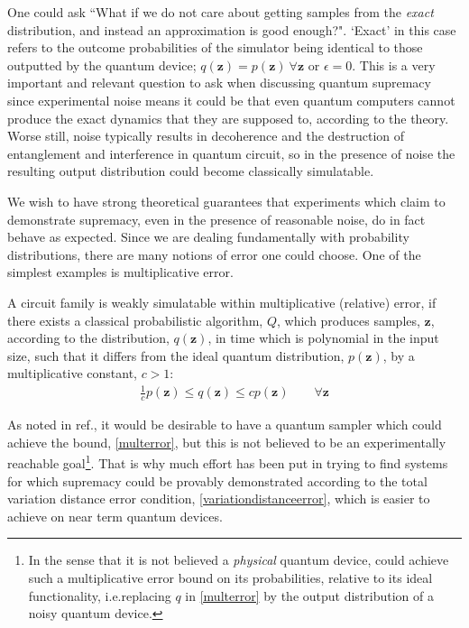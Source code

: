 One could ask ``What if we do not care about getting samples from the \textit{exact} distribution, and instead an approximation is good enough?". `Exact' in this case refers to the outcome probabilities of the simulator being identical to those outputted by the quantum device; $q(\mathbf{z}) = p(\mathbf{z})~ \forall \mathbf{z}$ or $\epsilon = 0$. This is a very important and relevant question to ask when discussing quantum supremacy since experimental noise means it could be that even quantum computers cannot produce the exact dynamics that they are supposed to, according to the theory. Worse still, noise typically results in decoherence and the destruction of entanglement and interference in quantum circuit, so in the presence of noise the resulting output distribution could become classically simulatable.

We wish to have strong theoretical guarantees that experiments which claim to demonstrate supremacy, even in the presence of reasonable noise, do in fact behave as expected. Since we are dealing fundamentally with probability distributions, there are many notions of error one could choose. One of the simplest examples is multiplicative error.

\begin{definition}
    \label{defnmulterror}
    A circuit family is weakly simulatable within multiplicative (relative) error, if there exists a classical probabilistic algorithm, $Q$, which produces samples, $\mathbf{z}$, according to the distribution, $q(\mathbf{z})$,  in time which is polynomial in the input size, such that it differs from the ideal quantum distribution, $p(\mathbf{z})$, by a multiplicative constant, $c > 1$:
    \begin{align}
        \frac{1}{c}p(\mathbf{z}) \leq q(\mathbf{z}) \leq c p(\mathbf{z}) \qquad \forall \mathbf{z} \label{multerror}
    \end{align}
\end{definition}

As noted in ref., it would be desirable to have a quantum sampler which could achieve the bound, \eqref{multerror}, but this is not believed to be an experimentally reachable goal\footnote{In the sense that it is not believed a \textit{physical} quantum device, could achieve such a multiplicative error bound on its probabilities, relative to its ideal functionality, i.e.\@ replacing $q$ in \eqref{multerror} by the output distribution of a noisy quantum device.}. That is why much effort has been put in trying to find systems for which supremacy could be provably demonstrated according to the total variation distance error condition, \eqref{variationdistanceerror}, which is easier to achieve on near term quantum devices. 


